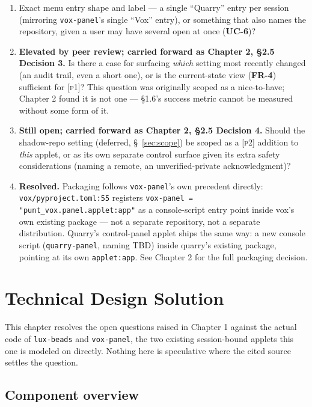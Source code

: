 \documentclass[a4paper,11pt]{report}
\newcommand{\uc}[1]{\textbf{UC-#1}}
\newcommand{\fr}[1]{\textbf{FR-#1}}
\newcommand{\pone}{\textsc{[p1]}}
\newcommand{\ptwo}{\textsc{[p2]}}
\begin{document}
\begin{enumerate}
  \item Exact menu entry shape and label --- a single ``Quarry'' entry
    per session (mirroring \texttt{vox-panel}'s single ``Vox'' entry), or
    something that also names the repository, given a user may have
    several open at once (\uc{6})?
  \item \textbf{Elevated by peer review; carried forward as Chapter 2,
    \S2.5 Decision 3.} Is there a case for surfacing \emph{which}
    setting most recently changed (an audit trail, even a short one), or
    is the current-state view (\fr{4}) sufficient for \pone{}? This
    question was originally scoped as a nice-to-have; Chapter 2 found it
    is not one --- \S1.6's success metric cannot be measured without
    some form of it.
  \item \textbf{Still open; carried forward as Chapter 2, \S2.5 Decision
    4.} Should the shadow-repo setting (deferred, \S~\ref{sec:scope}) be
    scoped as a \ptwo{} addition to \emph{this} applet, or as its own
    separate control surface given its extra safety considerations
    (naming a remote, an unverified-private acknowledgment)?
  \item \textbf{Resolved.} Packaging follows \texttt{vox-panel}'s own
    precedent directly: \texttt{vox/pyproject.toml:55} registers
    \texttt{vox-panel = "punt\_vox.panel.applet:app"} as a console-script
    entry point inside vox's own existing package --- not a separate
    repository, not a separate distribution. Quarry's control-panel
    applet ships the same way: a new console script
    (\texttt{quarry-panel}, naming TBD) inside quarry's existing package,
    pointing at its own \texttt{applet:app}. See Chapter 2 for the full
    packaging decision.
\end{enumerate}

\chapter{Technical Design Solution}

This chapter resolves the open questions raised in Chapter 1 against the
actual code of \texttt{lux-beads} and \texttt{vox-panel}, the two
existing session-bound applets this one is modeled on directly. Nothing
here is speculative where the cited source settles the question.

\section{Component overview}
\end{document}
